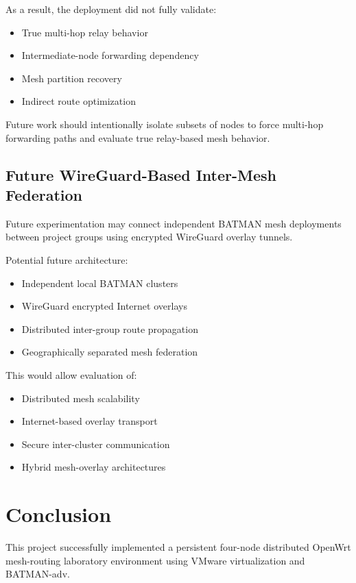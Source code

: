 \documentclass[conference]{IEEEtran}
\begin{document}
As a result, the deployment did not fully validate:

\begin{itemize}
    \item True multi-hop relay behavior
    \item Intermediate-node forwarding dependency
    \item Mesh partition recovery
    \item Indirect route optimization
\end{itemize}

Future work should intentionally isolate subsets of nodes to force multi-hop forwarding paths and evaluate true relay-based mesh behavior.

\subsection{Future WireGuard-Based Inter-Mesh Federation}

Future experimentation may connect independent BATMAN mesh deployments between project groups using encrypted WireGuard overlay tunnels.

Potential future architecture:

\begin{itemize}
    \item Independent local BATMAN clusters
    \item WireGuard encrypted Internet overlays
    \item Distributed inter-group route propagation
    \item Geographically separated mesh federation
\end{itemize}

This would allow evaluation of:
\begin{itemize}
    \item Distributed mesh scalability
    \item Internet-based overlay transport
    \item Secure inter-cluster communication
    \item Hybrid mesh-overlay architectures
\end{itemize}

\section{Conclusion}

This project successfully implemented a persistent four-node distributed OpenWrt mesh-routing laboratory environment using VMware virtualization and BATMAN-adv.
\end{document}
